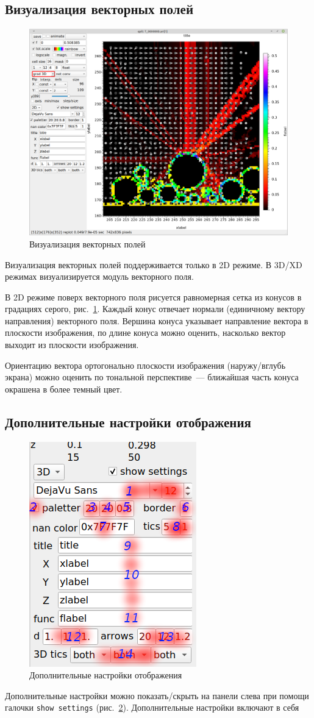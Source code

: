 \documentclass[12pt]{article}
\begin{document}
\subsection{Визуализация векторных полей}
\begin{figure}[h]
  \begin{center}
      \includegraphics[width=.7\textwidth]{picts/2D-grad.png} 
  \end{center}
  \caption{Визуализация векторных полей}\label{2D:grad:pict}
\end{figure}
Визуализация векторных полей поддерживается только в 2D режиме.
В 3D/XD режимах визуализируется модуль векторного поля. 

В 2D режиме поверх векторного поля рисуется равномерная сетка из конусов в градациях серого, рис.~\ref{2D:grad:pict}.
Каждый конус отвечает нормали (единичному вектору направления) векторного поля.
Вершина конуса указывает направление вектора в плоскости
изображения, по длине конуса можно оценить, насколько вектор выходит из плоскости изображения.

Ориентацию вектора ортогонально плоскости изображения (наружу/вглубь экрана) можно оценить по тональной перспективе~---
ближайшая часть конуса окрашена в более темный цвет.


\subsection{Дополнительные настройки отображения}
\begin{figure}[h]
  \begin{center}
      \includegraphics[width=.28\textwidth]{picts/settings.png} 
  \end{center}
  \caption{Дополнительные настройки отображения}\label{settings:pict}
\end{figure}
Дополнительные настройки можно показать/скрыть на панели слева при помощи галочки \verb'show settings' (рис.~\ref{settings:pict}).
Дополнительные настройки включают в себя
\end{document}
